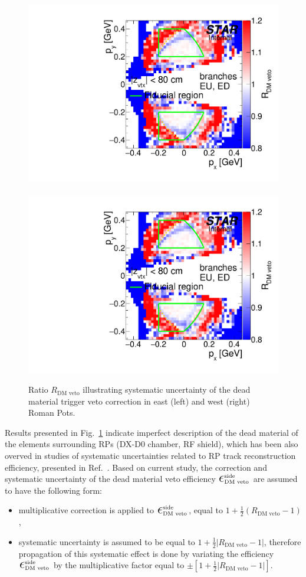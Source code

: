 \begin{figure}[h]
\centering
\includegraphics[width=.48\textwidth,page=1]{graphics/systematics/deadMatSyst.pdf}~~~~%
\includegraphics[width=.48\textwidth,page=2]{graphics/systematics/deadMatSyst.pdf}%
\caption[Estimated systematic uncertainty related to trigger veto induced by interaction with dead material.]{Ratio $R_{\text{DM~veto}}$ illustrating systematic uncertainty of the dead material trigger veto correction in east (left) and west (right) Roman Pots.}
\label{fig:systDMveto}
\end{figure}

Results presented in Fig.~\ref{fig:systDMveto} indicate imperfect description of the dead material of the elements surrounding RPs (DX-D0 chamber, RF shield), which has been also overved in studies of systematic uncertainties related to RP track reconstruction efficiency, presented in Ref.~\cite{supplementaryNote}. Based on current study, the correction and systematic uncertainty of the dead material veto efficiency $\mbox{\LARGE$\epsilon$}_{\text{DM~veto}}^{\text{side}}$ are assumed to have the following form: 
\begin{itemize}
\item multiplicative correction is applied to $\mbox{\LARGE$\epsilon$}_{\text{DM~veto}}^{\text{side}}$, equal to $1+\frac{1}{2}(R_{\text{DM~veto}}-1)$,
 \item systematic uncertainty is assumed to be equal to $1+\frac{1}{2}|R_{\text{DM~veto}}-1|$, therefore propagation of this systematic effect is done by variating the efficiency $\mbox{\LARGE$\epsilon$}_{\text{DM~veto}}^{\text{side}}$ by the multiplicative factor equal to $\pm\left[1+\frac{1}{2}|R_{\text{DM~veto}}-1|\right]$. 
\end{itemize} 


